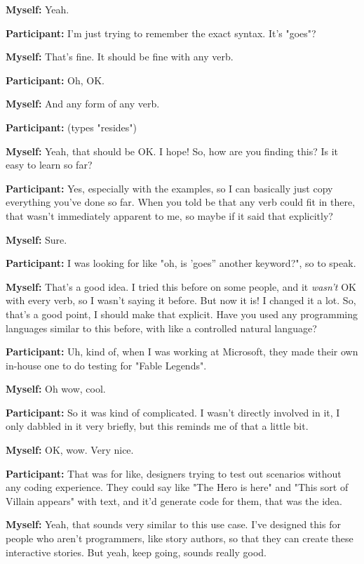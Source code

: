 \documentclass[11pt]{report}
\newcommand{\llabel}[1]{\hypertarget{llineno:#1}{\linelabel{#1}}}
\begin{document}
\begin{linenumbers}
\textbf{Myself:} Yeah.

\textbf{Participant:} I'm just trying to remember the exact syntax. It's
"goes"?\llabel{lne:syntax2a}

\textbf{Myself:} That's fine. It should be fine with any verb.

\textbf{Participant:} Oh, OK.

\textbf{Myself:} And any form of any verb.

\textbf{Participant:} (types "resides")

\textbf{Myself:} Yeah, that should be OK. I hope! So, how are you finding this? Is it easy to learn so far?

\textbf{Participant:} Yes, especially with the examples, so I can basically just copy everything you've done so far. When you told be that any verb could fit in there, that wasn't immediately apparent to me, so maybe if it said that explicitly?

\textbf{Myself:} Sure.

\textbf{Participant:} I was looking for like "oh, is 'goes'' another keyword?", so to speak.

\textbf{Myself:} That's a good idea. I tried this before on some people, and it \emph{wasn't} OK with every verb, so I wasn't saying it before. But now it is! I changed it a lot. So, that's a good point, I should make that explicit. Have you used any programming languages similar to this before, with like a controlled natural language?

\textbf{Participant:} Uh, kind of, when I was working at Microsoft, they made their own in-house one to do testing for "Fable Legends".

\textbf{Myself:} Oh wow, cool.

\textbf{Participant:} So it was kind of complicated. I wasn't directly involved in it, I only dabbled in it very briefly, but this reminds me of that a little bit.

\textbf{Myself:} OK, wow. Very nice.

\textbf{Participant:} That was for like, designers trying to test out scenarios without any coding experience. They could say like "The Hero is here" and "This sort of Villain appears" with text, and it'd generate code for them, that was the idea.

\textbf{Myself:} Yeah, that sounds very similar to this use case. I've designed this for people who aren't programmers, like story authors, so that they can create these interactive stories. But yeah, keep going, sounds really good.


\end{linenumbers}
\end{document}
